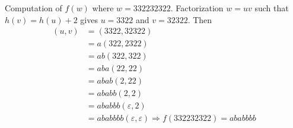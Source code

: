 \documentclass{beamer}
\theoremstyle{definition}
\begin{document}
%
%
%







\begin{frame}
\begin{example}
Computation of $f(w)$ where $w=332232322$. Factorization $w=uv$ such that $h(v)=h(u)+2$ gives $u=3322$ and $v=32322$. Then 
\begin{align*}
(u, v) &= (3322, 32322)\\
&= a(322, 2322)\\
&= ab(322, 322)\\
&= aba(22, 22)\\
&= abab(2, 22)\\
&= ababb(2, 2)\\
&= ababbb(\varepsilon, 2)\\
&= ababbbb(\varepsilon, \varepsilon)\Rightarrow f(332232322)=ababbbb
\end{align*}
\end{example}
\end{frame}
\end{document}
